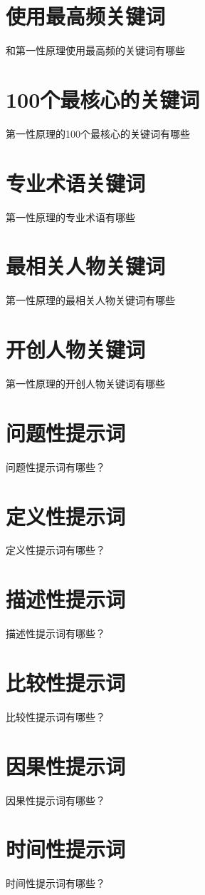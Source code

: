 \documentclass[12pt]{book}
\begin{document}
\section{使用最高频关键词}
和{第一性原理}使用最高频的关键词有哪些

\section{100个最核心的关键词}
{第一性原理}的100个最核心的关键词有哪些

\section{专业术语关键词}
{第一性原理}的专业术语有哪些

\section{最相关人物关键词}
{第一性原理}的最相关人物关键词有哪些

\section{开创人物关键词}
{第一性原理}的开创人物关键词有哪些

\section{问题性提示词}
问题性提示词有哪些？

\section{定义性提示词}
定义性提示词有哪些？

\section{描述性提示词}
描述性提示词有哪些？

\section{比较性提示词}
比较性提示词有哪些？


\section{因果性提示词}
因果性提示词有哪些？


\section{时间性提示词}
时间性提示词有哪些？
\end{document}
